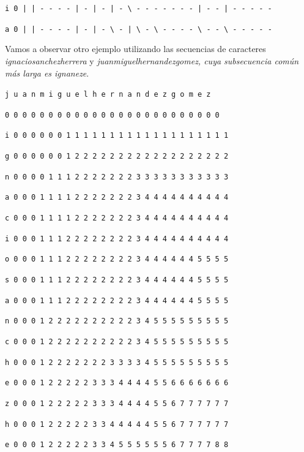 \documentclass[11pt,a4paper]{article} %
\begin{document}
\texttt{i 0 | | - - - - | - | - | - \textbackslash{ }- - - - - - - | - - | - - - - -}

\texttt{a 0 | | - - - - | - | - \textbackslash{ }- | \textbackslash{ }- \textbackslash{ }- - - - \textbackslash{ }- - \textbackslash{ }- - - - -}

\normalsize


Vamos a observar otro ejemplo utilizando las secuencias de caracteres \textit{ignaciosanchezherrera} y \textit{juanmiguelhernandezgomez, cuya subsecuencia común más larga es \textit{ignaneze}}.\\

\small

\hspace{1,72 em} \texttt{j u a n m i g u e l h e r n a n d e z g o m e z}

\hspace{0,71 em} \texttt{0 0 0 0 0 0 0 0 0 0 0 0 0 0 0 0 0 0 0 0 0 0 0 0 0}

\texttt{i 0 0 0 0 0 0 1 1 1 1 1 1 1 1 1 1 1 1 1 1 1 1 1 1 1}

\texttt{g 0 0 0 0 0 0 1 2 2 2 2 2 2 2 2 2 2 2 2 2 2 2 2 2 2}

\texttt{n 0 0 0 0 1 1 1 2 2 2 2 2 2 2 3 3 3 3 3 3 3 3 3 3 3}

\texttt{a 0 0 0 1 1 1 1 2 2 2 2 2 2 2 3 4 4 4 4 4 4 4 4 4 4}

\texttt{c 0 0 0 1 1 1 1 2 2 2 2 2 2 2 3 4 4 4 4 4 4 4 4 4 4}

\texttt{i 0 0 0 1 1 1 2 2 2 2 2 2 2 2 3 4 4 4 4 4 4 4 4 4 4}

\texttt{o 0 0 0 1 1 1 2 2 2 2 2 2 2 2 3 4 4 4 4 4 4 5 5 5 5}

\texttt{s 0 0 0 1 1 1 2 2 2 2 2 2 2 2 3 4 4 4 4 4 4 5 5 5 5}

\texttt{a 0 0 0 1 1 1 2 2 2 2 2 2 2 2 3 4 4 4 4 4 4 5 5 5 5}

\texttt{n 0 0 0 1 2 2 2 2 2 2 2 2 2 2 3 4 5 5 5 5 5 5 5 5 5}

\texttt{c 0 0 0 1 2 2 2 2 2 2 2 2 2 2 3 4 5 5 5 5 5 5 5 5 5}

\texttt{h 0 0 0 1 2 2 2 2 2 2 2 3 3 3 3 4 5 5 5 5 5 5 5 5 5}

\texttt{e 0 0 0 1 2 2 2 2 2 3 3 3 4 4 4 4 5 5 6 6 6 6 6 6 6}

\texttt{z 0 0 0 1 2 2 2 2 2 3 3 3 4 4 4 4 5 5 6 7 7 7 7 7 7}

\texttt{h 0 0 0 1 2 2 2 2 2 3 3 4 4 4 4 4 5 5 6 7 7 7 7 7 7}

\texttt{e 0 0 0 1 2 2 2 2 2 3 3 4 5 5 5 5 5 5 6 7 7 7 7 8 8}
\end{document}
